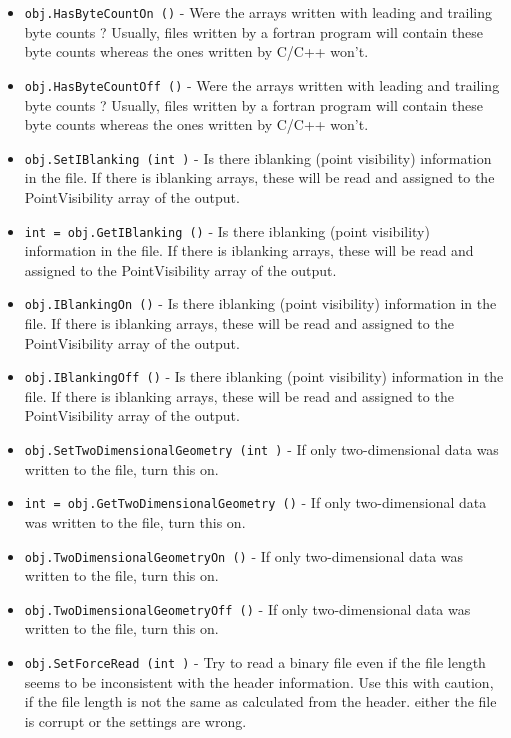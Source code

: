 \begin{itemize}
\item  \verb|obj.HasByteCountOn ()| -  Were the arrays written with leading and trailing byte counts ?
 Usually, files written by a fortran program will contain these
 byte counts whereas the ones written by C/C++ won't.

\item  \verb|obj.HasByteCountOff ()| -  Were the arrays written with leading and trailing byte counts ?
 Usually, files written by a fortran program will contain these
 byte counts whereas the ones written by C/C++ won't.

\item  \verb|obj.SetIBlanking (int )| -  Is there iblanking (point visibility) information in the file.
 If there is iblanking arrays, these will be read and assigned
 to the PointVisibility array of the output.

\item  \verb|int = obj.GetIBlanking ()| -  Is there iblanking (point visibility) information in the file.
 If there is iblanking arrays, these will be read and assigned
 to the PointVisibility array of the output.

\item  \verb|obj.IBlankingOn ()| -  Is there iblanking (point visibility) information in the file.
 If there is iblanking arrays, these will be read and assigned
 to the PointVisibility array of the output.

\item  \verb|obj.IBlankingOff ()| -  Is there iblanking (point visibility) information in the file.
 If there is iblanking arrays, these will be read and assigned
 to the PointVisibility array of the output.

\item  \verb|obj.SetTwoDimensionalGeometry (int )| -  If only two-dimensional data was written to the file,
 turn this on.

\item  \verb|int = obj.GetTwoDimensionalGeometry ()| -  If only two-dimensional data was written to the file,
 turn this on.

\item  \verb|obj.TwoDimensionalGeometryOn ()| -  If only two-dimensional data was written to the file,
 turn this on.

\item  \verb|obj.TwoDimensionalGeometryOff ()| -  If only two-dimensional data was written to the file,
 turn this on.

\item  \verb|obj.SetForceRead (int )| -  Try to read a binary file even if the file length seems to be
 inconsistent with the header information. Use this with caution,
 if the file length is not the same as calculated from the header.
 either the file is corrupt or the settings are wrong. 


\end{itemize}
